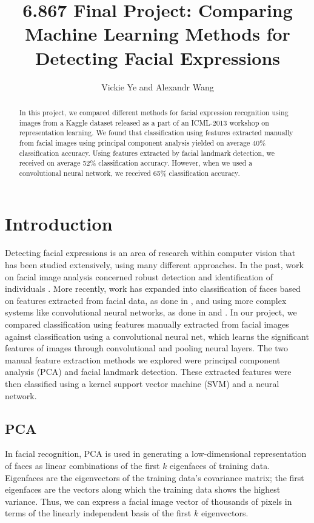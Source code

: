 \documentclass[10pt, twocolumn, twoside]{article}
\title{6.867 Final Project: Comparing Machine Learning Methods for Detecting Facial Expressions} %
\date{}
\author {Vickie Ye and Alexandr Wang}
\begin{document}
\maketitle


\begin{abstract}
In this project, we compared different methods for facial expression recognition
using images from a Kaggle dataset released as a part of an ICML-2013 workshop
on representation learning.
We found that classification using features extracted manually from facial images
using principal component analysis yielded on average 40\% classification accuracy.
Using features extracted by facial landmark detection, we received on average 52\%
classification accuracy. However, when we used a convolutional neural network, we
received 65\% classification accuracy.
\end{abstract}

\section{Introduction}

Detecting facial expressions is an area of research within computer vision that has
been studied extensively, using many different approaches. In the past, work on
facial image analysis concerned robust detection and identification of individuals
\cite{Samal}. More recently, work has expanded into classification of faces based on
features extracted from facial data, as done in \cite{Bartlett}, and using more complex
systems like convolutional neural networks, as done in \cite{Lawrence} and \cite{Matsugu}.
In our project, we compared classification using features manually extracted from
facial images against classification using a convolutional neural net, which learns
the significant features of images through convolutional and pooling neural layers.
The two manual feature extraction methods we explored were principal component
analysis (PCA) and facial landmark detection. These extracted features were then
classified using a kernel support vector machine (SVM) and a neural network.

\subsection{PCA}

In facial recognition, PCA is used in generating a low-dimensional representation of
faces as linear combinations of the first $k$ eigenfaces of training data.
Eigenfaces are the eigenvectors of the training data's covariance matrix; the first
eigenfaces are the vectors along which the training data shows the highest variance.
Thus, we can express a facial image vector of thousands of pixels in terms of
the linearly independent basis of the first $k$ eigenvectors. 
\end{document}
